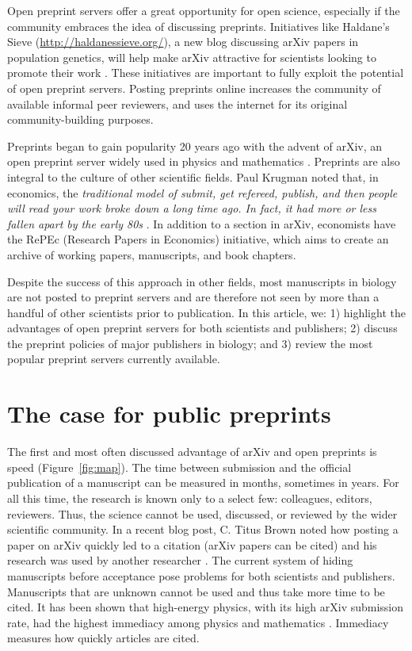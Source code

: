 \documentclass[letterpaper,twocolumn,superscriptaddress,showkeys,longbibliography]{revtex4-1}
\begin{document}
Open preprint servers offer a great opportunity for open science, especially if
the community embraces the idea of discussing preprints. Initiatives like
Haldane's Sieve (\href{http://haldanessieve.org/}{http://haldanessieve.org/}), a
new blog discussing arXiv papers in population genetics, will help make arXiv
attractive for scientists looking to promote their work \cite{lom12}. These
initiatives are important to fully exploit the potential of open preprint
servers. Posting preprints online increases the community of available informal
peer reviewers, and uses the internet for its original community-building
purposes.

Preprints began to gain popularity 20 years ago with the advent of arXiv, an
open preprint server widely used in physics and mathematics \cite{gin11}.
Preprints are also integral to the culture of other scientific fields.  Paul
Krugman noted that, in economics, the \emph{traditional model of submit, get
refereed, publish, and then people will read your work broke down a long time
ago. In fact, it had more or less fallen apart by the early 80s} \cite{kru12}.
In addition to a section in arXiv, economists have the RePEc (Research Papers in
Economics) initiative, which aims to create an archive of working papers,
manuscripts, and book chapters.

Despite the success of this approach in other fields, most manuscripts in
biology are not posted to preprint servers and are therefore not seen by more
than a handful of other scientists prior to publication. In this article, we: 1)
highlight the advantages of open preprint servers for both scientists and
publishers; 2) discuss the preprint policies of major publishers in biology; and
3) review the most popular preprint servers currently available.

\section{The case for public preprints}

The first and most often discussed advantage of arXiv and open preprints is
speed (Figure~\ref{fig:map}). The time between submission and the official
publication of a manuscript can be measured in months, sometimes in years. For
all this time, the research is known only to a select few: colleagues, editors,
reviewers. Thus, the science cannot be used, discussed, or reviewed by the wider
scientific community. In a recent blog post, C. Titus Brown noted how posting a
paper on arXiv quickly led to a citation (arXiv papers can be cited) and his
research was used by another researcher \cite{bro12}. The current system of
hiding manuscripts before acceptance pose problems for both scientists and
publishers. Manuscripts that are unknown cannot be used and thus take more time
to be cited. It has been shown that high-energy physics, with its high arXiv
submission rate, had the highest immediacy among physics and mathematics
\cite{pra05}. Immediacy measures how quickly articles are cited. 
\end{document}
